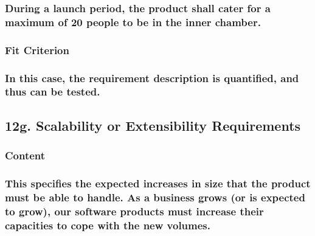 \documentclass[
]{article}
\begin{document}
\hypertarget{during-a-launch-period-the-product-shall-cater-for-a-maximum-of-20-people-to-be-in-the-inner-chamber.}{%
\subsubsection{During a launch period, the product shall cater for a
maximum of 20 people to be in the inner
chamber.}\label{during-a-launch-period-the-product-shall-cater-for-a-maximum-of-20-people-to-be-in-the-inner-chamber.}}

\hypertarget{fit-criterion-7}{%
\subsubsection{Fit Criterion}\label{fit-criterion-7}}

\hypertarget{in-this-case-the-requirement-description-is-quantified-and-thus-can-be-tested.}{%
\subsubsection{In this case, the requirement description is quantified,
and thus can be
tested.}\label{in-this-case-the-requirement-description-is-quantified-and-thus-can-be-tested.}}

\hypertarget{g.-scalability-or-extensibility-requirements}{%
\subsection{12g. Scalability or Extensibility
Requirements}\label{g.-scalability-or-extensibility-requirements}}

\hypertarget{content-43}{%
\subsubsection{Content}\label{content-43}}

\hypertarget{this-specifies-the-expected-increases-in-size-that-the-product-must-be-able-to-handle.-as-a-business-grows-or-is-expected-to-grow-our-software-products-must-increase-their-capacities-to-cope-with-the-new-volumes.}{%
\subsubsection{\texorpdfstring{This specifies the expected increases in
size that the product must be able to handle. As a business grows (or is
expected to grow), our software products must increase their capacities
to cope with the new volumes.
}{This specifies the expected increases in size that the product must be able to handle. As a business grows (or is expected to grow), our software products must increase their capacities to cope with the new volumes. }}\label{this-specifies-the-expected-increases-in-size-that-the-product-must-be-able-to-handle.-as-a-business-grows-or-is-expected-to-grow-our-software-products-must-increase-their-capacities-to-cope-with-the-new-volumes.}}
\end{document}
